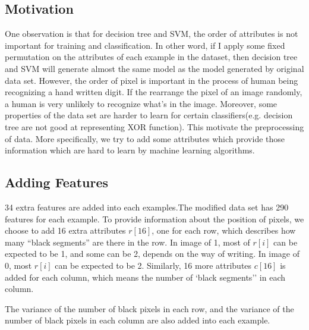 \documentclass[a4paper,11pt]{article}
\begin{document}
\subsection{Motivation}
One observation is that for decision tree and SVM, the order of attributes is not important for training and classification. In other word, if I apply some fixed permutation on the attributes of each example in the dataset, then decision tree and SVM will generate almost the same model as the model generated by original data set.
However, the order of pixel is important in the process of human being recognizing a hand written digit. If the rearrange the pixel of an image randomly, a human is very unlikely to recognize what's in the image.
Moreover, some properties of the data set are harder to learn for certain classifiers(e.g. decision tree are not good at representing XOR function).
This motivate the preprocessing of data. More specifically, we try to add some attributes which provide those information which are hard to learn by machine learning algorithms.
\subsection{Adding Features}
34 extra features are added into each examples.The modified data set has 290 features for each example.
To provide information about the position of pixels, we choose to add 16 extra attributes $r[16]$, one for each row, which describes how many ``black segments'' are there in the row. In image of 1, most of $r[i]$ can be expected to be 1, and some can be 2, depends on the way of writing. In image of 0, most $r[i]$ can be expected to be 2.
Similarly, 16 more attributes $c[16]$ is added for each column, which means the number of `black segments'' in each column.

The variance of the number of black pixels in each row, and the variance of the number of black pixels in each column are also added into each example.
\end{document}
